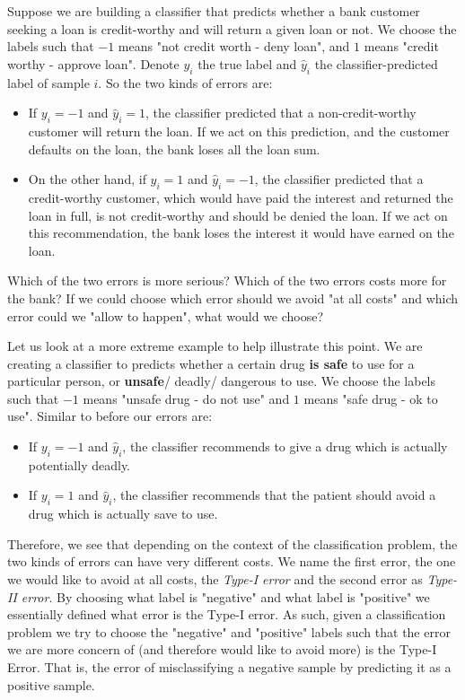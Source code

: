 \begin{example}
	Suppose we are building a classifier that predicts whether a bank customer seeking a loan is credit-worthy and will return a given loan or not. We choose the labels such that $-1$ means "not credit worth - deny loan", and $1$ means "credit worthy - approve loan". Denote $y_i$ the true label and $\widehat{y}_i$ the classifier-predicted label of sample $i$. So the two kinds of errors are:
	\begin{itemize}
		\item If $y_i=-1$ and $\widehat{y}_i=1$, the classifier predicted that a non-credit-worthy customer will return the loan. If we act on this prediction, and the customer defaults on the loan, the bank loses all the loan sum.
		\item On the other hand, if $y_i=1$ and $\widehat{y}_i=-1$, the classifier predicted that a credit-worthy customer, which would have paid the interest and returned the loan in full, is not credit-worthy and should be denied the loan. If we act on this recommendation, the bank loses the interest it would have earned on the loan.
	\end{itemize}
	Which of the two errors is more serious? Which of the two errors costs more for the bank? If we could choose which error should we avoid "at all costs" and which error could we "allow to happen", what would we choose?
\end{example}

\begin{example}
	Let us look at a more extreme example to help illustrate this point. We are creating a classifier to predicts whether a certain drug \textbf{is safe} to use for a particular person, or \textbf{unsafe}/ deadly/ dangerous to use. We choose the labels such that $-1$ means "unsafe drug - do not use" and $1$ means "safe drug - ok to
	use". Similar to before our errors are:
	\begin{itemize}
		\item If $y_i=-1$ and $\widehat{y}_i$, the classifier recommends to give a drug which is actually potentially deadly.
		\item If $y_i=1$ and $\widehat{y}_i$, the classifier recommends that the patient should avoid a drug which is actually save to use.
	\end{itemize}
\end{example}

Therefore, we see that depending on the context of the classification problem, the two kinds of errors can have very different costs. We name the first error, the one we would like to avoid at all costs, the \textit{Type-I error} and the second error as \textit{Type-II error}. By choosing what label is "negative" and what label is "positive" we essentially defined what error is the Type-I error. As such, given a classification problem we try to choose the "negative" and "positive" labels such that the error we are more concern of (and therefore would like to avoid more) is the Type-I Error. That is, the error of misclassifying a negative sample by predicting it as a positive sample.

